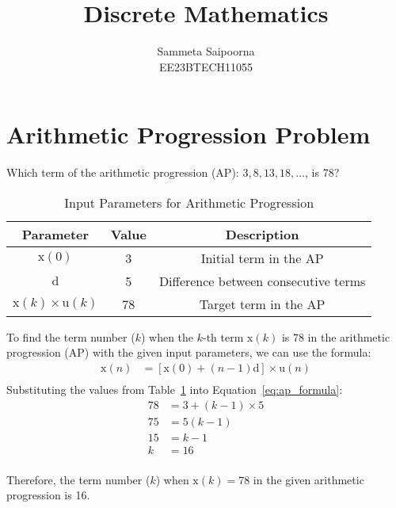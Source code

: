 \documentclass[12pt]{article}
\title{Discrete Mathematics}
\author{Sammeta Saipoorna\\ EE23BTECH11055}
\date{}
\begin{document}
\maketitle

\section{Arithmetic Progression Problem}
Which term of the arithmetic progression (AP): $3, 8, 13, 18, \ldots$, is 78?

\begin{table}[h]
    \centering
    \begin{tabular}{|c|c|c|}
        \hline
        \textbf{Parameter} & \textbf{Value} & \textbf{Description} \\
        \hline
        $\mathrm{x}(0)$ & 3 & Initial term in the AP \\
        \hline
        $\mathrm{d}$ & 5 & Difference between consecutive terms \\
        \hline
        $\mathrm{x}(k) \times \mathrm{u}(k)$ & 78 & Target term in the AP \\
        \hline
    \end{tabular}
    \caption{Input Parameters for Arithmetic Progression}
    \label{tab:input_parameters}
\end{table}

To find the term number ($k$) when the $k$-th term $\mathrm{x}(k)$ is 78 in the arithmetic progression (AP) with the given input parameters, we can use the formula:
\begin{align}
 \mathrm{x}(n) &= [\mathrm{x}(0) + (n-1)\mathrm{d}] \times \mathrm{u}(n) \label{eq:ap_formula} \\
\end{align}
Substituting the values from Table~\ref{tab:input_parameters} into Equation~\eqref{eq:ap_formula}:
\begin{align*}
 78 &= 3 + (k-1) \times 5 \\
 75 &= 5(k-1) \\
 15 &= k-1 \\
 k &= 16 \\
\end{align*}

Therefore, the term number ($k$) when $\mathrm{x}(k) = 78$ in the given arithmetic progression is 16.
\end{document}
